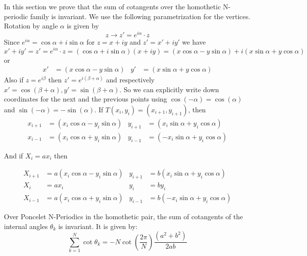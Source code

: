 In this section we prove that the sum of cotangents over the homothetic N-periodic family is invariant.
We use the following parametrization for the vertices.
Rotation by angle $\alpha$ is given by
\[ z\to z' = e^{i \alpha} \cdot z \]
Since $e^{i \alpha} = \cos \alpha + i \sin \alpha$
for $z = x + i y$ and $z'=x'+iy'$ we have
\[
   x'+iy' = z' 
 = e^{i \alpha} \cdot z
 = (\cos \alpha + i \sin \alpha) (x + i y) 
 = (x \cos \alpha - y \sin \alpha) + i (x \sin \alpha + y \cos \alpha)
\] 
or
\begin{align*} x' &= (x \cos \alpha - y \sin \alpha)    &     y' &= (x \sin \alpha + y \cos \alpha) \end{align*}
Also if $z = e^{i \beta}$ then $z' = e^{i (\beta+\alpha)}$ and respectively $x'=\cos(\beta+\alpha), y'=\sin(\beta+\alpha)$.
So we can explicitly write down coordinates for the next and the previous points using $\cos(-\alpha)=\cos(\alpha)$ and $\sin(-\alpha)=-\sin(\alpha)$.
If $T (x_i,y_i) = (x_{i+1},y_{i+1})$, then
\begin{align*} 
x_{i+1} &= (x_i \cos \alpha - y_i \sin \alpha)    &     y_{i+1} &= (x_i \sin \alpha + y_i \cos \alpha)  \\
x_{i-1} &= (x_i \cos \alpha + y_i \sin \alpha)    &     y_{i-1} &= (-x_i \sin \alpha + y_i \cos \alpha)  
\end{align*}

And if $X_i = a x_i$ then

\begin{align} 
X_{i+1} &= a(x_i \cos \alpha - y_i \sin \alpha) & y_{i+1} &= b( x_i \sin \alpha + y_i \cos \alpha) \nonumber \\
X_i &= a x_i & y_i &= b y_i \label{eq:scaled-dynamics} \\
X_{i-1} &= a(x_i \cos \alpha + y_i \sin \alpha)   &    y_{i-1} &= b(-x_i \sin \alpha + y_i \cos \alpha) \nonumber
\end{align}



\begin{theorem}
Over Poncelet N-Periodics in the homothetic pair, the sum of cotangents of the internal angles $\theta_k$ is invariant. It is given by:
\[ \sum_{k=1}^N \cot\theta_k	=-  N \cot
		\left( {\frac {2\pi}{N}} \right)  \frac {\left( {a}^{2}+{b}^{2} \right) }{2ab}
\]	
\label{th:cot}
\end{theorem}

